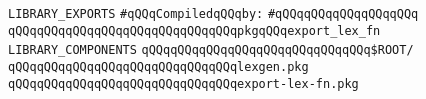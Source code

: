 \label{src/app/lex/mythryl-lex.lib}
\verb|LIBRARY_EXPORTS|\newline
\newline
\verb|#qQQqCompiledqQQqby:|\newline
\verb|#qQQqqQQqqQQqqQQqqQQq|\newline
\newline
\verb|qQQqqQQqqQQqqQQqqQQqqQQqqQQqqQQqpkgqQQqexport_lex_fn|\newline
\newline
\newline
\verb|LIBRARY_COMPONENTS|\newline
\newline
\verb|qQQqqQQqqQQqqQQqqQQqqQQqqQQqqQQq$ROOT/|\newline
\newline
\verb|qQQqqQQqqQQqqQQqqQQqqQQqqQQqqQQqlexgen.pkg|\newline
\verb|qQQqqQQqqQQqqQQqqQQqqQQqqQQqqQQqexport-lex-fn.pkg|\newline

